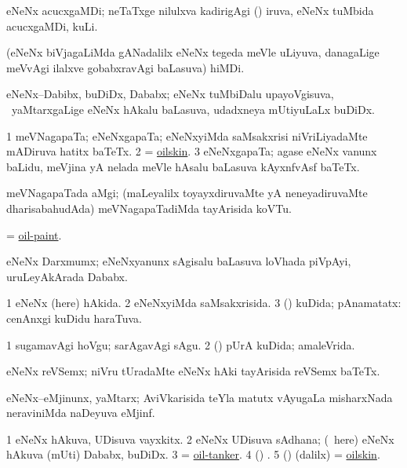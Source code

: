 \bentry
{}
\gl{\nA}
\bmng
eNeNx acucxgaMDi; neTaTxge nilulxva kadirigAgi () iruva, eNeNx tuMbida acucxgaMDi, kuLi. 
\emng
\eentry

\bentry
{}
\gl{\nA}
\bmng
(eNeNx biVjagaLiMda gANadalilx eNeNx tegeda meVle uLiyuva, danagaLige meVvAgi ilalxve gobabxravAgi baLasuva) hiMDi. 
\emng
\eentry

\bentry
{}
\gl{\nA}
\bmng
eNeNx--Dabibx, buDiDx, Dababx; eNeNx tuMbiDalu upayoVgisuva, \kanmu\ yaMtarxgaLige eNeNx hAkalu baLasuva, udadxneya mUtiyuLaLx buDiDx. 
\emng
\eentry

\bentry
{}
\gl{\nA}
\bmng
\bnum
\num{1} meVNagapaTa; eNeNxgapaTa; eNeNxyiMda saMsakxrisi niVriLiyadaMte mADiruva hatitx baTeTx. 
\num{2} = \hyperlink{oilskin}{oilskin}. 
\num{3} eNeNxgapaTa; agase eNeNx \mo vanunx baLidu, meVjina yA nelada meVle hAsalu baLasuva kAyxnfvAsf baTeTx. 
\enum
\emng
\eentry

\bentry
{}
\gl{\nA}
\bmng
meVNagapaTada aMgi; (maLeyalilx toyayxdiruvaMte yA neneyadiruvaMte dharisabahudAda) meVNagapaTadiMda tayArisida koVTu. 
\emng
\eentry

\bentry
{}
\gl{\nA}
\bmng
= \hyperlink{oil-paint}{oil-paint}. 
\emng
\eentry

\bentry
{}
\gl{\nA}
\bmng
eNeNx Darxmumx; eNeNxyanunx sAgisalu baLasuva loVhada piVpAyi, uruLeyAkArada Dababx. 
\emng
\eentry

\bentry
{}
\gl{\gu}
\bmng
\bnum
\num{1} eNeNx (here) hAkida. 
\num{2} eNeNxyiMda saMsakxrisida. 
\num{3} (\ashi) kuDida; pAnamatatx:  cenAnxgi kuDidu haraTuva. 
\enum
\emng

\noindent
\gl{\pagu}
\bmng
\bnum
\num{1}  sugamavAgi hoVgu; sarAgavAgi sAgu. 
\num{2}  (\AmA) pUrA kuDida; amaleVrida. 
\enum
\emng
\eentry

\bentry
{}
\gl{\nA}
\bmng
eNeNx reVSemx; niVru tUradaMte eNeNx hAki tayArisida reVSemx baTeTx. 
\emng
\eentry

\bentry
{}
\gl{\nA}
\bmng
eNeNx--eMjinunx, yaMtarx; AviVkarisida teYla matutx vAyugaLa misharxNada neraviniMda naDeyuva eMjinf. 
\emng
\eentry

\bentry
{}
\gl{\nA}
\bmng
\bnum
\num{1} eNeNx hAkuva, UDisuva vayxkitx. 
\num{2} eNeNx UDisuva sAdhana; (\kanmu\ here) eNeNx hAkuva (mUti) Dababx, buDiDx. 
\num{3} = \hyperlink{oil-tanker}{oil-tanker}. 
\num{4} (\ame) . 
\num{5} (\ame) (\bava dalilx) = \hyperlink{oilskin}{oilskin}. 
\enum
\emng
\eentry

